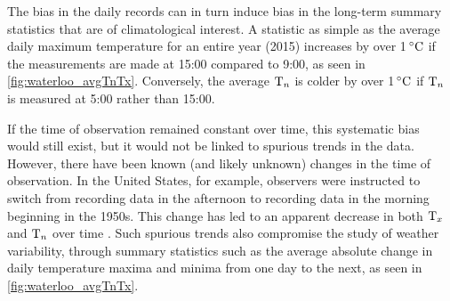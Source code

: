The bias in the daily records can in turn induce bias in the long-term summary statistics that are of climatological interest.
A statistic as simple as the average daily maximum temperature for an entire year (2015) increases by over 1\({\,^\circ}{}\mathrm{C}\) if the measurements are made at 15:00 compared to 9:00, as seen in \autoref{fig:waterloo_avgTnTx}.
Conversely, the average \(\mathrm{T}_{n}\) is colder by over 1\({\,^\circ}{}\mathrm{C}\) if \(\mathrm{T}_{n}\) is measured at 5:00 rather than 15:00.

If the time of observation remained constant over time, this systematic bias would still exist, but it would not be linked to spurious trends in the data. However, there have been known (and likely unknown) changes in the time of observation.
In the United States, for example, observers were instructed to switch from recording data in the afternoon to recording data in the morning beginning in the 1950s.
This change has led to an apparent decrease in both \(\mathrm{T}_{x}\) and \(\mathrm{T}_{n}\) over time \citep{menne2009us}. 
Such spurious trends also compromise the study of weather variability, through summary statistics such as the average absolute change in daily temperature maxima and minima from one day to the next, as seen in \autoref{fig:waterloo_avgTnTx}.



